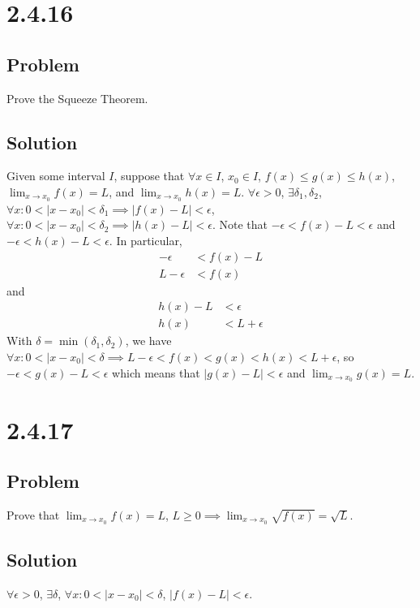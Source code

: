 \documentclass[12pt]{article}
\newcommand{\abs}  [1]{\left|       #1 \right|      }
\begin{document}
\section*{2.4.16}

\subsection*{Problem}
Prove the Squeeze Theorem.

\subsection*{Solution}
Given some interval $I$, suppose that $\forall x \in I$, $x_0 \in I$, $f(x) \leq g(x) \leq h(x)$, $\lim_{x \to x_0} f(x) = L$, and $\lim_{x \to x_0} h(x) = L$. $\forall \epsilon > 0$, $\exists \delta_1, \delta_2$, $\forall x : 0 < \abs{x - x_0} < \delta_1 \implies \abs{f(x) - L} < \epsilon$, $\forall x : 0 < \abs{x - x_0} < \delta_2 \implies \abs{h(x) - L} < \epsilon$. Note that $-\epsilon < f(x) - L < \epsilon$ and $-\epsilon < h(x) - L < \epsilon$. In particular,
\begin{align*}
    -\epsilon &< f(x) - L \\
    L - \epsilon &< f(x)
\end{align*}
and
\begin{align*}
    h(x) - L &< \epsilon \\
    h(x) &< L + \epsilon
\end{align*}
With $\delta = \min(\delta_1, \delta_2)$, we have $\forall x : 0 < \abs{x - x_0} < \delta \implies L - \epsilon < f(x) < g(x) < h(x) < L + \epsilon$, so $-\epsilon < g(x) - L < \epsilon$ which means that $\abs{g(x) - L} < \epsilon$ and $\lim_{x \to x_0} g(x) = L$.



\section*{2.4.17}

\subsection*{Problem}
Prove that $\lim_{x \to x_0} f(x) = L$, $L \geq 0 \implies \lim_{x \to x_0} \sqrt{f(x)} = \sqrt{L}$.

\subsection*{Solution}
$\forall \epsilon > 0$, $\exists \delta$, $\forall x : 0 < \abs{x - x_0} < \delta$, $\abs{f(x) - L} < \epsilon$.
\end{document}
